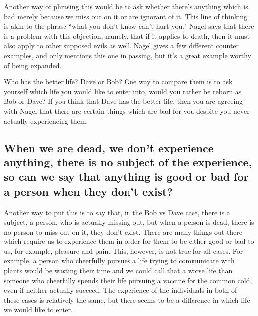 Another way of phrasing this would be to ask whether there's anything which is bad merely because we miss out on it or are ignorant of it. This line of thinking is akin to the phrase ``what you don't know can't hurt you." Nagel says that there is a problem with this objection, namely, that if it applies to death, then it must also apply to other supposed evils as well. Nagel gives a few different counter examples, and only mentions this one in passing, but it's a great example worthy of being expanded. 


Who has the better life? Dave or Bob? One way to compare them is to ask yourself which life you would like to enter into, would you rather be reborn as Bob or Dave? If you think that Dave has the better life, then you are agreeing with Nagel that there are certain things which are bad for you despite you never actually experiencing them.  

\subsection{When we are dead, we don’t experience anything, there is no subject of the experience, so can we say that anything is good or bad for a person when they don’t exist?}

Another way to put this is to say that, in the Bob vs Dave case, there is a subject, a person, who is actually missing out, but when a person is dead, there is no person to miss out on it, they don't exist. There are many things out there which require us to experience them in order for them to be either good or bad to us, for example, pleasure and pain. This, however, is not true for all cases. For example, a person who cheerfully pursues a life trying to communicate with plants would be wasting their time and we could call that a worse life than someone who cheerfully spends their life pursuing a vaccine for the common cold, even if neither actually succeed. The experience of the individuals in both of these cases is relatively the same, but there seems to be a difference in which life we would like to enter.   

